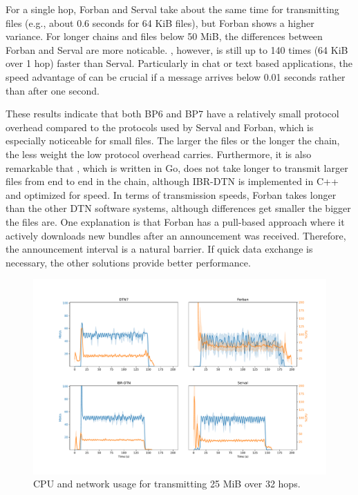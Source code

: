 For a single hop, Forban and Serval take about the same time for transmitting files (e.g., about 0.6 seconds for 64 KiB files), but Forban shows a higher variance.
For longer chains and files below 50 MiB, the differences between Forban and Serval are more noticable.
\dtn, however, is still up to 140 times (64 KiB over 1 hop) faster than Serval. %
Particularly in chat or text based applications, the speed advantage of \dtn can be crucial if a message arrives below 0.01 seconds rather than after one second.

These results indicate that both BP6 and BP7 have a relatively small protocol overhead compared to the protocols used by Serval and Forban, which is especially noticeable for small files.
The larger the files or the longer the chain, the less weight the low protocol overhead carries.
Furthermore, it is also remarkable that \dtn, which is written in Go, does not take longer to transmit larger files from end to end in the chain, although IBR-DTN is implemented in C++ and optimized for speed.
In terms of transmission speeds, Forban takes longer than the other DTN software systems, although differences get smaller the bigger the files are. One explanation is that Forban has a pull-based approach where it actively downloads new bundles after an announcement was received. Therefore, the announcement interval is a natural barrier. If quick data exchange is necessary, the other solutions provide better performance.

\begin{figure}[t]
\hspace{-15mm}
    \includegraphics[width=1.2\columnwidth]{figs/cpu_network.pdf}
    \caption{CPU and network usage for transmitting 25 MiB over 32 hops.}
    \label{fig:cpu_net}
\end{figure}


